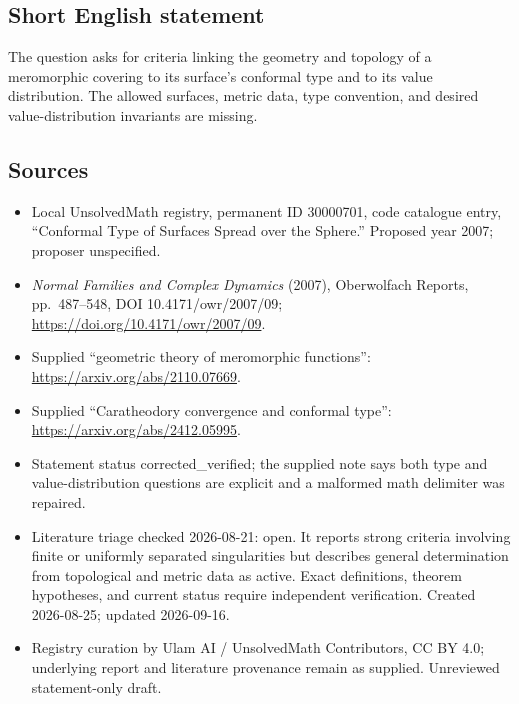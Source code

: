 \documentclass[11pt]{article}
\begin{document}
\subsection{Short English statement}
The question asks for criteria linking the geometry and topology of a meromorphic covering to its surface's conformal type and to its value distribution. The allowed surfaces, metric data, type convention, and desired value-distribution invariants are missing.
\subsection{Sources}
\begin{itemize}
\item Local UnsolvedMath registry, permanent ID 30000701, code catalogue entry, ``Conformal Type of Surfaces Spread over the Sphere.'' Proposed year 2007; proposer unspecified.
\item \emph{Normal Families and Complex Dynamics} (2007), Oberwolfach Reports, pp.\ 487--548, DOI 10.4171/owr/2007/09; \url{https://doi.org/10.4171/owr/2007/09}.
\item Supplied ``geometric theory of meromorphic functions'': \url{https://arxiv.org/abs/2110.07669}.
\item Supplied ``Caratheodory convergence and conformal type'': \url{https://arxiv.org/abs/2412.05995}.
\item Statement status corrected\_verified; the supplied note says both type and value-distribution questions are explicit and a malformed math delimiter was repaired.
\item Literature triage checked 2026-08-21: open. It reports strong criteria involving finite or uniformly separated singularities but describes general determination from topological and metric data as active. Exact definitions, theorem hypotheses, and current status require independent verification. Created 2026-08-25; updated 2026-09-16.
\item Registry curation by Ulam AI / UnsolvedMath Contributors, CC BY 4.0; underlying report and literature provenance remain as supplied. Unreviewed statement-only draft.
\end{itemize}
\end{document}
